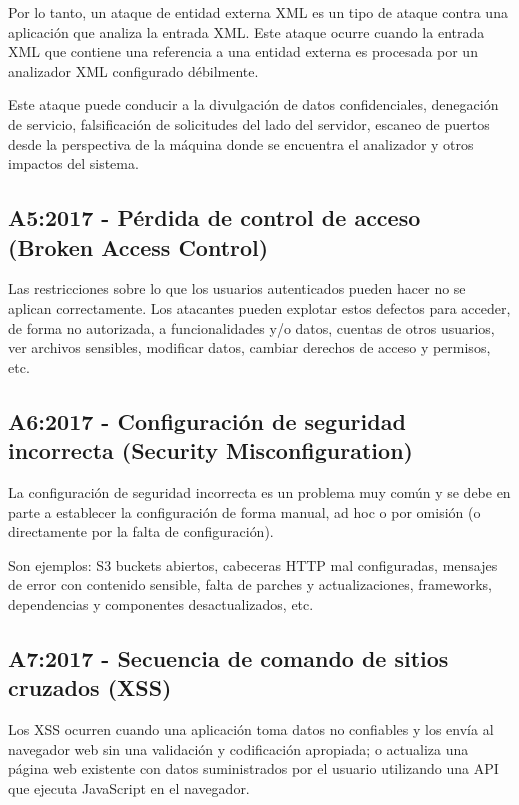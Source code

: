 Por lo tanto, un ataque de entidad externa XML es un tipo de ataque contra una aplicación que analiza 
la entrada XML. Este ataque ocurre cuando la entrada XML que contiene una referencia a una 
entidad externa es procesada por un analizador XML configurado débilmente. 

Este ataque puede conducir a la divulgación de datos confidenciales, denegación de servicio, falsificación 
de solicitudes del lado del servidor, escaneo de puertos desde la perspectiva de la máquina donde se 
encuentra el analizador y otros impactos del sistema.

\newpage
\subsection{A5:2017 - Pérdida de control de acceso (Broken Access Control)}

Las restricciones sobre lo que los usuarios autenticados pueden hacer no se aplican
correctamente. Los atacantes pueden explotar estos defectos para acceder, de forma no
autorizada, a funcionalidades y/o datos, cuentas de otros usuarios, ver archivos sensibles,
modificar datos, cambiar derechos de acceso y permisos, etc. 

\subsection{A6:2017 - Configuración de seguridad incorrecta (Security Misconfiguration)}

La configuración de seguridad incorrecta es un problema muy común y se debe en parte a
establecer la configuración de forma manual, ad hoc o por omisión (o directamente por la falta de
configuración). 

Son ejemplos: S3 buckets abiertos, cabeceras HTTP mal configuradas, mensajes
de error con contenido sensible, falta de parches y actualizaciones, frameworks, dependencias y
componentes desactualizados, etc.

\subsection{A7:2017 - Secuencia de comando de sitios cruzados (XSS)}

Los XSS ocurren cuando una aplicación toma datos no confiables y los envía al navegador web
sin una validación y codificación apropiada; o actualiza una página web existente con datos
suministrados por el usuario utilizando una API que ejecuta JavaScript en el navegador.

